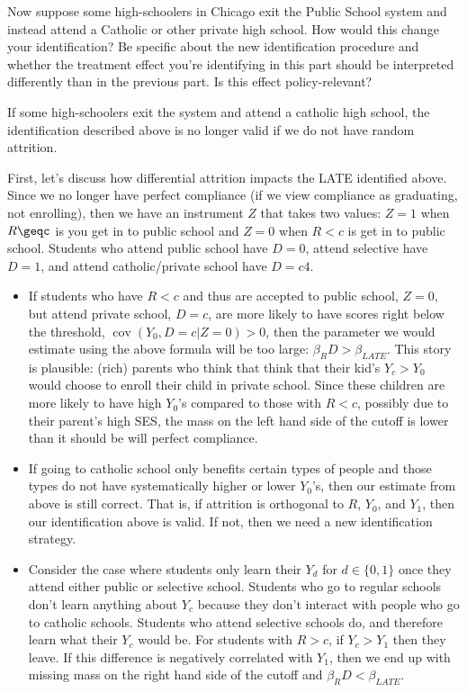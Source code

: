 \documentclass{article}
\begin{document}
\begin{problem}{3}
Now suppose some high-schoolers in Chicago exit the Public School system and instead attend a Catholic or other private high school. How would this change your identification? Be specific about the new identification procedure and whether the treatment effect you're identifying in this part should be interpreted differently than in the previous part. Is this effect policy-relevant?
\end{problem}
\begin{solution}
If some high-schoolers exit the system and attend a catholic high school, the identification described above is no longer valid if we do not have random attrition. 

First, let's discuss how differential attrition impacts the LATE identified above. Since we no longer have perfect compliance (if we view compliance as graduating, not enrolling), then we have an instrument $Z$ that takes two values: $Z=1$ when $R\geqc$ is you get in to public school and $Z=0$ when $R<c$ is get in to public school. Students who attend public school have $D=0$, attend selective have $D=1$, and attend catholic/private school have $D=c4$. 
\begin{itemize}
    \item If students who have $R<c$ and thus are accepted to public school, $Z=0$, but attend private school, $D=c$, are more likely to have scores right below the threshold, $\operatorname{cov}(Y_0,D=c|Z=0)>0$, then the parameter we would estimate using the above formula will be too large: $\beta_RD > \beta_{LATE}$. This story is plausible: (rich) parents who think that think that their kid's $Y_c>Y_0$ would choose to enroll their child in private school. Since these children are more likely to have high $Y_0$'s compared to those with $R<c$, possibly due to their parent's high SES, the mass on the left hand side of the cutoff is lower than it should be will perfect compliance. 
    \item If going to catholic school only benefits certain types of people and those types do not have systematically higher or lower $Y_0$'s, then our estimate from above is still correct. That is, if attrition is orthogonal to $R$, $Y_0$, and $Y_1$, then our identification above is valid. If not, then we need a new identification strategy.
    \item Consider the case where students only learn their $Y_d$ for $d\in \{0,1\}$ once they attend either public or selective school. Students who go to regular schools don't learn anything about $Y_c$ because they don't interact with people who go to catholic schools. Students who attend selective schools do, and therefore learn what their $Y_c$ would be. For students with $R>c$, if $Y_c>Y_1$ then they leave. If this difference is negatively correlated with $Y_1$, then we end up with missing mass on the right hand side of the cutoff and $\beta_RD < \beta_{LATE}$.
\end{itemize}


\end{solution}
\end{document}

